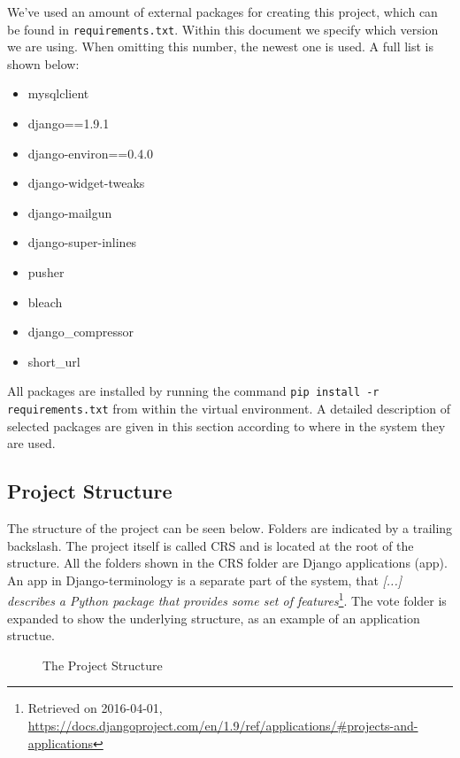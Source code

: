We've used an amount of external packages for creating this project, which can be found in \texttt{requirements.txt}. Within this document we specify which version we are using. When omitting this number, the newest one is used. A full list is shown below:

\begin{itemize}
    \item mysqlclient
    \item django==1.9.1
    \item django-environ==0.4.0
    \item django-widget-tweaks
    \item django-mailgun
    \item django-super-inlines
    \item pusher
    \item bleach
    \item django\_compressor
    \item short\_url
\end{itemize}

All packages are installed by running the command \texttt{pip install -r requirements.txt} from within the virtual environment. A detailed description of selected packages are given in this section according to where in the system they are used.

\subsection{Project Structure}
The structure of the project can be seen below. Folders are indicated by a trailing backslash. The project itself is called CRS and is located at the root of the structure. All the folders shown in the CRS folder are Django applications (app). An app in Django-terminology is a separate part of the system, that \emph{[...] describes a Python package that provides some set of features}\footnote{Retrieved on 2016-04-01, \url{https://docs.djangoproject.com/en/1.9/ref/applications/\#projects-and-applications}}. The vote folder is expanded to show the underlying structure, as an example of an application structue.

\begin{figure}[H]
    \caption{The Project Structure}
    \label{fig:project-structure}
\end{figure}

